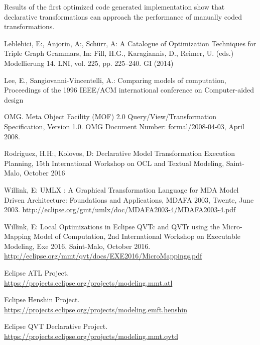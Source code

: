 \documentclass{llncs}
\begin{document}
Results of the first optimized code generated implementation show that declarative transformations can approach the performance of manually coded transformations.  
%
%
\begin{thebibliography}{}

Leblebici, E:, Anjorin, A:, Sch\"urr, A: A Catalogue of Optimization Techniques for Triple Graph Grammars,
In:  Fill,  H.G.,  Karagiannis,  D.,  Reimer,  U.  (eds.)
Modellierung 14. LNI, vol. 225, pp. 225–240. GI (2014)

Lee, E., Sangiovanni-Vincentelli, A.: Comparing models of computation, Proceedings of the 1996 IEEE/ACM international conference on Computer-aided design

OMG. Meta Object Facility (MOF) 2.0 Query/View/Transformation Specification, Version 1.0.
OMG Document Number: formal/2008-04-03, April 2008.

Rodriguez, H.H:, Kolovos, D: Declarative Model Transformation Execution Planning,
15th International Workshop on OCL and Textual Modeling, Saint-Malo, October 2016

Willink, E: UMLX : A Graphical Transformation Language for MDA
Model Driven Architecture: Foundations and Applications, MDAFA 2003, Twente, June 2003.
\url{http://eclipse.org/gmt/umlx/doc/MDAFA2003-4/MDAFA2003-4.pdf}

Willink, E: Local Optimizations in Eclipse QVTc and QVTr using the Micro-Mapping Model of Computation,
2nd International Workshop on Executable Modeling, Exe 2016, Saint-Malo, October 2016.
\url{http://eclipse.org/mmt/qvt/docs/EXE2016/MicroMappings.pdf}

Eclipse ATL Project.\\
\url{https://projects.eclipse.org/projects/modeling.mmt.atl}

Eclipse Henshin Project.\\
\url{https://projects.eclipse.org/projects/modeling.emft.henshin}

Eclipse QVT Declarative Project.\\
\url{https://projects.eclipse.org/projects/modeling.mmt.qvtd}

\end{thebibliography}
\end{document}
